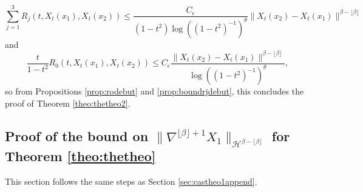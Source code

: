 \documentclass{article}
\begin{document}
$$\sum_{j=1}^3 R_j(t,X_t(x_1),X_t(x_2))\leq \frac{C_\epsilon}{(1-t^2)\log((1-t^2)^{-1})^\theta} \|X_t(x_2)-X_t(x_1)\|^{\beta-\lfloor \beta \rfloor}$$
and 
$$\frac{t}{1-t^2}R_0(t,X_t(x_1),X_t(x_2))\leq C_\epsilon\frac{\|X_t(x_2)-X_t(x_1)\|^{\beta-\lfloor \beta \rfloor}}{\log((1-t^2)^{-1})^\theta},$$
so from Propositions \ref{prop:rodebut} and \ref{prop:boundrjdebut}, this concludes the proof of Theorem \ref{theo:thetheo2}.
















\subsection{Proof of the bound on $\|\nabla^{\lfloor \beta \rfloor+1} X_1\|_{\mathcal{H}^{\beta-\lfloor \beta \rfloor}}$ for Theorem \ref{theo:thetheo}}
This section follows the same steps as Section \ref{sec:castheo1append}.
\end{document}
